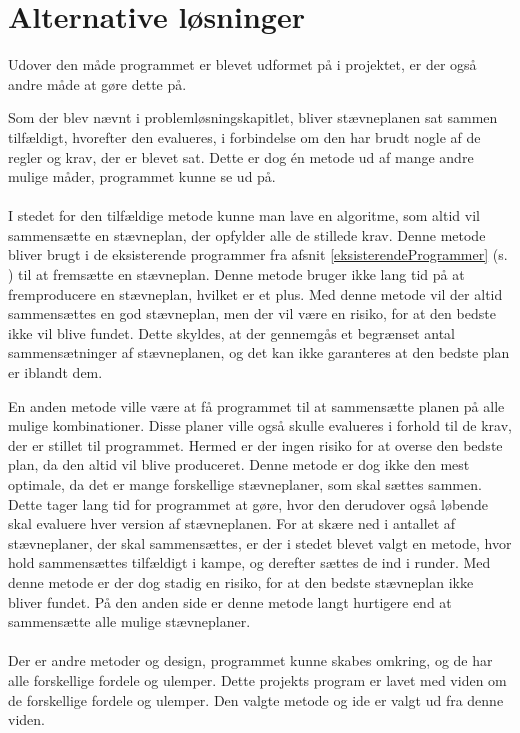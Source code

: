 \section*{Alternative løsninger}
Udover den måde programmet er blevet udformet på i projektet, er der også andre måde at gøre dette på.
\par
Som der blev nævnt i problemløsningskapitlet, bliver stævneplanen sat sammen tilfældigt, hvorefter den evalueres, i forbindelse om den har brudt nogle af de regler og krav, der er blevet sat. Dette er dog én metode ud af mange andre mulige måder, programmet kunne se ud på.
\\\\
I stedet for den tilfældige metode kunne man lave en algoritme, som altid vil sammensætte en stævneplan, der opfylder alle de stillede krav. Denne metode bliver brugt i de eksisterende programmer fra afsnit \ref{eksisterendeProgrammer} (s. \pageref{eksisterendeProgrammer}) til at fremsætte en stævneplan. Denne metode bruger ikke lang tid på at fremproducere en stævneplan, hvilket er et plus. Med denne metode vil der altid sammensættes en god stævneplan, men der vil være en risiko, for at den bedste ikke vil blive fundet. Dette skyldes, at der gennemgås et begrænset antal sammensætninger af stævneplanen, og det kan ikke garanteres at den bedste plan er iblandt dem.
\par
En anden metode ville være at få programmet til at sammensætte planen på alle mulige kombinationer. Disse planer ville også skulle evalueres i forhold til de krav, der er stillet til programmet. Hermed er der ingen risiko for at overse den bedste plan, da den altid vil blive produceret. Denne metode er dog ikke den mest optimale, da det er mange forskellige stævneplaner, som skal sættes sammen.
Dette tager lang tid for programmet at gøre, hvor den derudover også løbende skal evaluere hver version af stævneplanen. For at skære ned i antallet af stævneplaner, der skal sammensættes, er der i stedet blevet valgt en metode, hvor hold sammensættes tilfældigt i kampe, og derefter sættes de ind i runder. Med denne metode er der dog stadig en risiko, for at den bedste stævneplan ikke bliver fundet. På den anden side er denne metode langt hurtigere end at sammensætte alle mulige stævneplaner.
\\\\
Der er andre metoder og design, programmet kunne skabes omkring, og de har alle forskellige fordele og ulemper. Dette projekts program er lavet med viden om de forskellige fordele og ulemper. Den valgte metode og ide er valgt ud fra denne viden. 

